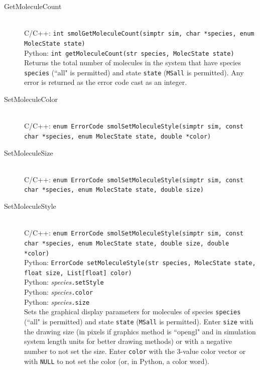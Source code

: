 \documentclass {scrbook}
\newcommand {\ttt} {\texttt}
\begin{document}
\begin{description}
\item[GetMoleculeCount]
\hfill \\
C/C++: \ttt{int smolGetMoleculeCount(simptr sim, char *species, enum MolecState state)}\\
Python: \ttt{int getMoleculeCount(str species, MolecState state)}\\
Returns the total number of molecules in the system that have species \ttt{species} (``all" is permitted) and state \ttt{state} (\ttt{MSall} is permitted). Any error is returned as the error code cast as an integer.

\item[SetMoleculeColor]
\hfill \\
C/C++: \ttt{enum ErrorCode smolSetMoleculeStyle(simptr sim, const char *species, enum MolecState state, double *color)}\\

\item[SetMoleculeSize]
\hfill \\
C/C++: \ttt{enum ErrorCode smolSetMoleculeStyle(simptr sim, const char *species, enum MolecState state, double size)}\\


\item[SetMoleculeStyle]
\hfill \\
C/C++: \ttt{enum ErrorCode smolSetMoleculeStyle(simptr sim, const char *species, enum MolecState state, double size, double *color)}\\
Python: \ttt{ErrorCode setMoleculeStyle(str species, MolecState state, float size, List[float] color)}\\
Python: \textit{species}\ttt{.setStyle}\\
Python: \textit{species}\ttt{.color}\\
Python: \textit{species}\ttt{.size}\\
Sets the graphical display parameters for molecules of species \ttt{species} (``all" is permitted) and state \ttt{state} (\ttt{MSall} is permitted). Enter \ttt{size} with the drawing size (in pixels if graphics method is ``opengl" and in simulation system length units for better drawing methods) or with a negative number to not set the size. Enter \ttt{color} with the 3-value color vector or with \ttt{NULL} to not set the color (or, in Python, a color word).

\end{description}
\end{document}
